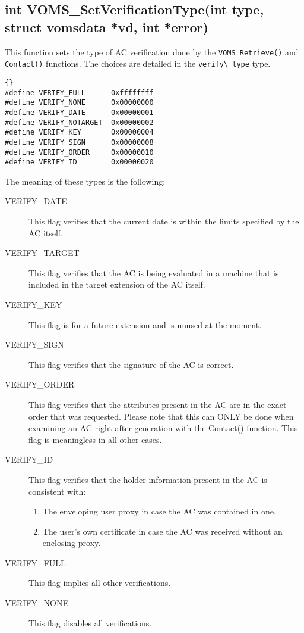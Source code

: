 \documentclass[a4paper]{book}
\begin{document}
\subsection{int VOMS\_SetVerificationType(int type, struct vomsdata
  *vd, int *error)}

This function sets the type of AC verification done by the
\verb|VOMS_Retrieve()| and \verb|Contact()| functions.  The choices
are detailed in the \verb|verify\_type| type.

\begin{lstlisting}{}
#define VERIFY_FULL      0xffffffff
#define VERIFY_NONE      0x00000000
#define VERIFY_DATE      0x00000001
#define VERIFY_NOTARGET  0x00000002
#define VERIFY_KEY       0x00000004
#define VERIFY_SIGN      0x00000008
#define VERIFY_ORDER     0x00000010
#define VERIFY_ID        0x00000020
\end{lstlisting}

The meaning of these types is the following:
\begin{description}
\item[VERIFY\_DATE] This flag verifies that the current date is
  within the limits specified by the AC itself.
\item[VERIFY\_TARGET] This flag verifies that the AC is being
  evaluated in a machine that is included in the target extension of
  the AC itself.
\item[VERIFY\_KEY] This flag is for a future extension and is unused at the
  moment. 
\item[VERIFY\_SIGN] This flag verifies that the signature of the AC
  is correct.
\item[VERIFY\_ORDER] This flag verifies that the attributes present
  in the AC are in the exact order that was requested.  Please note
  that this can ONLY be done when examining an AC right after
  generation with the Contact() function.  This flag is meaningless
  in all other cases.
\item[VERIFY\_ID] This flag verifies that the holder information
  present in the AC is consistent with:
\begin{enumerate}
\item The enveloping user proxy in case the AC was contained in one.
\item The user's own certificate in case the AC was received without
  an enclosing proxy.
\end{enumerate}
\item[VERIFY\_FULL] This flag implies all other verifications.
\item[VERIFY\_NONE] This flag disables all verifications.
\end{description}
\end{document}
